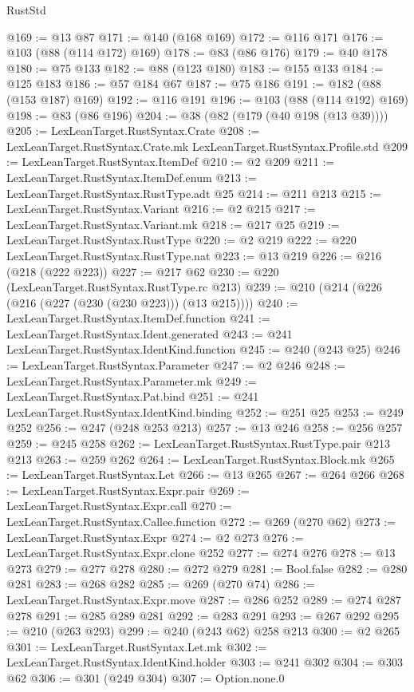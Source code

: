 \begin{lexlean}{RustStd}
\begin{coremodule}
@169 := @13 @87
@171 := @140 (@168 @169)
@172 := @116 @171
@176 := @103 (@88 (@114 @172) @169)
@178 := @83 (@86 @176)
@179 := @40 @178
@180 := @75 @133
@182 := @88 (@123 @180)
@183 := @155 @133
@184 := @125 @183
@186 := @57 @184 @67
@187 := @75 @186
@191 := @182 (@88 (@153 @187) @169)
@192 := @116 @191
@196 := @103 (@88 (@114 @192) @169)
@198 := @83 (@86 @196)
@204 := @38 (@82 (@179 (@40 @198 (@13 @39))))
@205 := LexLeanTarget.RustSyntax.Crate
@208 := LexLeanTarget.RustSyntax.Crate.mk LexLeanTarget.RustSyntax.Profile.std
@209 := LexLeanTarget.RustSyntax.ItemDef
@210 := @2 @209
@211 := LexLeanTarget.RustSyntax.ItemDef.enum
@213 := LexLeanTarget.RustSyntax.RustType.adt @25
@214 := @211 @213
@215 := LexLeanTarget.RustSyntax.Variant
@216 := @2 @215
@217 := LexLeanTarget.RustSyntax.Variant.mk
@218 := @217 @25
@219 := LexLeanTarget.RustSyntax.RustType
@220 := @2 @219
@222 := @220 LexLeanTarget.RustSyntax.RustType.nat
@223 := @13 @219
@226 := @216 (@218 (@222 @223))
@227 := @217 @62
@230 := @220 (LexLeanTarget.RustSyntax.RustType.rc @213)
@239 := @210 (@214 (@226 (@216 (@227 (@230 (@230 @223))) (@13 @215))))
@240 := LexLeanTarget.RustSyntax.ItemDef.function
@241 := LexLeanTarget.RustSyntax.Ident.generated
@243 := @241 LexLeanTarget.RustSyntax.IdentKind.function
@245 := @240 (@243 @25)
@246 := LexLeanTarget.RustSyntax.Parameter
@247 := @2 @246
@248 := LexLeanTarget.RustSyntax.Parameter.mk
@249 := LexLeanTarget.RustSyntax.Pat.bind
@251 := @241 LexLeanTarget.RustSyntax.IdentKind.binding
@252 := @251 @25
@253 := @249 @252
@256 := @247 (@248 @253 @213)
@257 := @13 @246
@258 := @256 @257
@259 := @245 @258
@262 := LexLeanTarget.RustSyntax.RustType.pair @213 @213
@263 := @259 @262
@264 := LexLeanTarget.RustSyntax.Block.mk
@265 := LexLeanTarget.RustSyntax.Let
@266 := @13 @265
@267 := @264 @266
@268 := LexLeanTarget.RustSyntax.Expr.pair
@269 := LexLeanTarget.RustSyntax.Expr.call
@270 := LexLeanTarget.RustSyntax.Callee.function
@272 := @269 (@270 @62)
@273 := LexLeanTarget.RustSyntax.Expr
@274 := @2 @273
@276 := LexLeanTarget.RustSyntax.Expr.clone @252
@277 := @274 @276
@278 := @13 @273
@279 := @277 @278
@280 := @272 @279
@281 := Bool.false
@282 := @280 @281
@283 := @268 @282
@285 := @269 (@270 @74)
@286 := LexLeanTarget.RustSyntax.Expr.move
@287 := @286 @252
@289 := @274 @287 @278
@291 := @285 @289 @281
@292 := @283 @291
@293 := @267 @292
@295 := @210 (@263 @293)
@299 := @240 (@243 @62) @258 @213
@300 := @2 @265
@301 := LexLeanTarget.RustSyntax.Let.mk
@302 := LexLeanTarget.RustSyntax.IdentKind.holder
@303 := @241 @302
@304 := @303 @62
@306 := @301 (@249 @304)
@307 := Option.none.{0}

\end{coremodule}
\end{lexlean}
